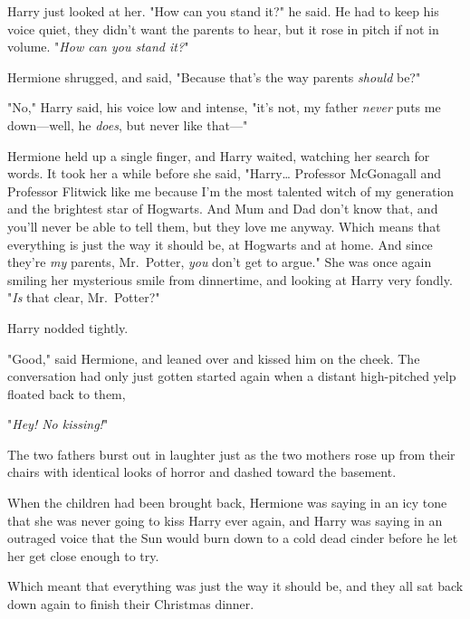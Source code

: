 Harry just looked at her. "How can you stand it?" he said. He had to keep his 
voice quiet, they didn't want the parents to hear, but it rose in pitch if not 
in volume. "\emph{How can you stand it?}"

Hermione shrugged, and said, "Because that's the way parents \emph{should} be?"

"No," Harry said, his voice low and intense, "it's not, my father \emph{never} 
puts me down---well, he \emph{does}, but never like that---"

Hermione held up a single finger, and Harry waited, watching her search for 
words. It took her a while before she said, "Harry{\ldots} Professor McGonagall 
and Professor Flitwick like me because I'm the most talented witch of my 
generation and the brightest star of Hogwarts. And Mum and Dad don't know that, 
and you'll never be able to tell them, but they love me anyway. Which means 
that everything is just the way it should be, at Hogwarts and at home. And 
since they're \emph{my} parents, Mr.~Potter, \emph{you} don't get to argue." 
She was once again smiling her mysterious smile from dinnertime, and looking at 
Harry very fondly. "\emph{Is} that clear, Mr.~Potter?"

Harry nodded tightly.

"Good," said Hermione, and leaned over and kissed him on the cheek.
\sbreak
The conversation had only just gotten started again when a distant high-pitched 
yelp floated back to them,

"\emph{Hey! No kissing!}"

The two fathers burst out in laughter just as the two mothers rose up from 
their chairs with identical looks of horror and dashed toward the basement.

When the children had been brought back, Hermione was saying in an icy tone 
that she was never going to kiss Harry ever again, and Harry was saying in an 
outraged voice that the Sun would burn down to a cold dead cinder before he let 
her get close enough to try.

Which meant that everything was just the way it should be, and they all sat 
back down again to finish their Christmas dinner.